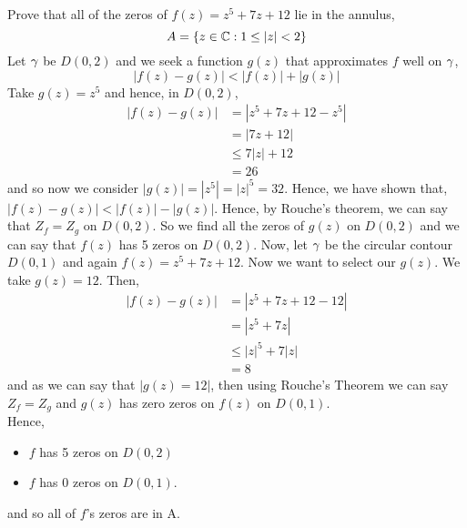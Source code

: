 \documentclass{article}
\begin{document}
\begin{eg}
  Prove that all of the zeros of $f(z) = z^5 + 7z + 12$ lie in the annulus,
  $$ A = \{z \in \mathbb{C} : 1 \le |z| < 2\} $$
  Let $\gamma$ be $D(0, 2)$ and we seek a function $g(z)$ that approximates $f$ well on $\gamma$,
  $$ |f(z) - g(z)| < |f(z)| + |g(z)| $$
  Take $g(z) = z^5$ and hence, in $D(0, 2)$,
  \begin{align*}
    |f(z) - g(z)| &= |z^5 + 7z + 12 - z^5|\\
    &= |7z + 12|\\
    &\le 7|z| + 12\\
    &= 26
  \end{align*}
  and so now we consider $|g(z)| = |z^5| = |z|^5 = 32$. Hence, we have shown that, $|f(z) - g(z)| < |f(z)| - |g(z)|$. Hence, by Rouche's theorem, we can say that $Z_f = Z_g$ on $D(0, 2)$. So we find all the zeros of $g(z)$ on $D(0, 2)$ and we can say that $f(z)$ has 5 zeros on $D(0, 2)$. Now, let $\gamma$ be the circular contour $D(0, 1)$ and again $f(z) = z^5 + 7z + 12$. Now we want to select our $g(z)$. We take $g(z) = 12$. Then,
  \begin{align*}
    |f(z) - g(z)| &= |z^5 + 7z + 12 - 12|\\
    &= |z^5 + 7z| \\
    &\le |z|^5 + 7|z|\\
    &= 8
  \end{align*}
  and as we can say that $|g(z) = 12|$, then using Rouche's Theorem we can say $Z_f = Z_g$ and $g(z)$ has zero zeros on $f(z)$ on $D(0, 1)$.\\
  Hence,
  \begin{itemize}
    \item $f$ has 5 zeros on $D(0, 2)$
    \item $f$ has 0 zeros on $D(0, 1)$.
  \end{itemize}
  and so all of $f$'s zeros are in A.
\end{eg}
\end{document}
